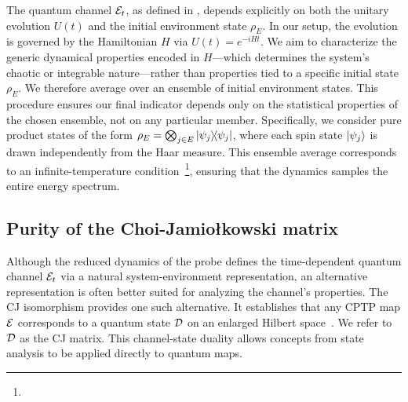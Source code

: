 \documentclass[letterpaper,superscriptaddress,aps,pra,nolongbibliography,showpacs,floatfix,dvipsnames,10pt,twocolumn]{revtex4-2}
\newcommand{\jami}{Choi-Jamiołkowski}
\begin{document}
The quantum channel $\mathcal{E}_t$, as defined in , depends
explicitly on both the unitary evolution $U(t)$ and the initial
environment state $\rho_E$. In our setup, the evolution is governed
by the Hamiltonian $H$ via $U(t) = e^{-iHt}$. We aim to
characterize the generic dynamical properties encoded in $H$---which
determines the system's chaotic or integrable nature---rather than
properties tied to a specific initial state $\rho_E$.
We therefore average over an ensemble of initial environment
states. This procedure ensures our final indicator depends only on the
statistical properties of the chosen ensemble, not on any particular member.
Specifically, we consider pure product states of the form
$\rho_E = \bigotimes_{j \in E} \dyad{\psi_j}$, where each spin state
$\ket{\psi_j}$ is drawn independently from the Haar measure.
This ensemble average corresponds to an infinite-temperature condition~\footnote{},
ensuring that the dynamics samples the entire energy spectrum. 

\subsection{Purity of the \jami{} matrix}\label{sec:choi_purity}
Although the reduced dynamics of the probe defines the
time-dependent quantum channel $\mathcal{E}_t$ via a natural system-environment
representation, an alternative representation is often better
suited for analyzing the channel's properties. The CJ
isomorphism provides one such alternative. It establishes that any
CPTP map $\mathcal{E}$ corresponds to a quantum state $\mathcal{D}$ on an enlarged Hilbert
space~\cite{jamiolkowski_1972_linear,choi_1975_completely}. We
refer to $\mathcal{D}$ as the CJ matrix. This channel-state
duality allows concepts from state analysis to be applied
directly to quantum maps.
\end{document}
